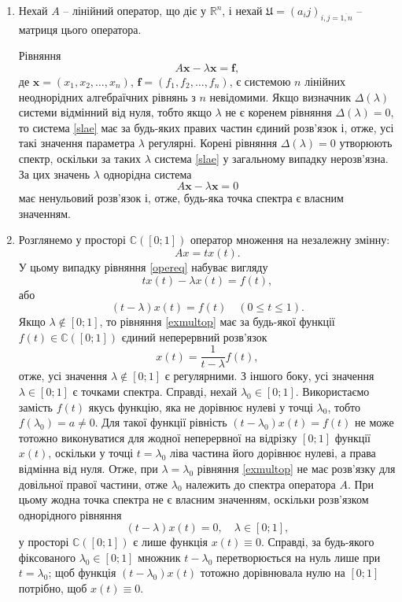 \documentclass[14pt,twoside]{extreport}
\theoremstyle{mystyle}
\numberwithin{equation}{chapter}
\begin{document}
\begin{enumerate}
	\item Нехай $A$ -- лінійний оператор, що діє у $\mathbb{R}^n$, і нехай $\mathfrak{U} = (a_ij)_{i,j = \overline{1, n}}$ -- матриця цього оператора.
	
	Рівняння
	\begin{equation}\label{slae}
	A\mathbf{x} - \lambda \mathbf{x} = \mathbf{f},
	\end{equation}
	де $\mathbf{x} = (x_1, x_2, \ldots, x_n)$, $\mathbf{f} = (f_1, f_2, \ldots, f_n)$, є системою $n$ лінійних неоднорідних алгебраїчних рівнянь з $n$ невідомими. Якщо визначник $\Delta (\lambda)$ системи відмінний від нуля, тобто якщо $\lambda$ не є коренем рівняння $\Delta(\lambda) = 0$, то система \eqref{slae} має за будь-яких правих частин єдиний розв'язок і, отже, усі такі значення параметра $\lambda$ регулярні. Корені рівняння $\Delta(\lambda) = 0$ утворюють спектр, оскільки за таких $\lambda$ система \eqref{slae} у загальному випадку нерозв'язна.  За цих значень $\lambda$ однорідна система
	\[
	A\mathbf{x} - \lambda \mathbf{x} = 0
	\]
	має ненульовий розв'язок і, отже, будь-яка точка спектра є власним значенням.
	\item Розглянемо у просторі $\mathbb{C}([0; 1])$ оператор множення на незалежну змінну:
	\[
	Ax = tx(t).
	\]
	У цьому випадку рівняння \eqref{opereq} набуває вигляду
	\[
	tx(t) - \lambda x(t) =f(t),
	\]
	або
	\begin{equation}\label{exmultop}
	(t-\lambda) x(t) = f(t) \quad (0 \leqslant t \leqslant 1).
	\end{equation}
	Якщо $\lambda \notin [0; 1]$, то рівняння \eqref{exmultop} має за будь-якої функції $f(t) \in \mathbb{C}([0; 1])$  єдиний неперервний розв'язок
	\[
	x(t) = \dfrac{1}{t-\lambda} f(t),
	\]
	отже, усі значення $\lambda \notin [0; 1]$ є регулярними.
	З іншого боку, усі значення $\lambda \in [0; 1]$ є точками спектра. Справді, нехай $\lambda_0 \in [0; 1]$. Використаємо замість $f(t)$ якусь функцію, яка не дорівнює нулеві у точці $\lambda_0$, тобто $f(\lambda_0) = a \neq 0$. Для такої функції рівність $(t- \lambda_0) x(t) = f(t)$ не може тотожно виконуватися для жодної неперервної на відрізку $[0; 1]$ функції $x(t)$, оскільки у точці $t = \lambda_0$ ліва частина його дорівнює нулеві, а права відмінна від нуля. Отже, при $\lambda = \lambda_0$ рівняння \eqref{exmultop} не має розв'язку для довільної правої частини, отже $\lambda_0$ належить до спектра оператора $A$. При цьому жодна точка спектра не є власним значенням, оскільки розв'язком однорідного рівняння
  \[
  (t-\lambda) x(t) = 0, \quad \lambda \in [0; 1],
  \]
у просторі $\mathbb{C}([0; 1])$ є лише функція $x(t) \equiv 0$. Справді, за будь-якого фіксованого $\lambda_0 \in [0; 1]$ множник $t - \lambda_0$ перетворюється на нуль лише при $t = \lambda_0$; щоб функція $(t-\lambda_0)x(t)$ тотожно дорівнювала нулю на $[0; 1]$ потрібно, щоб $x(t) \equiv 0$.
\end{enumerate}
\end{document}
